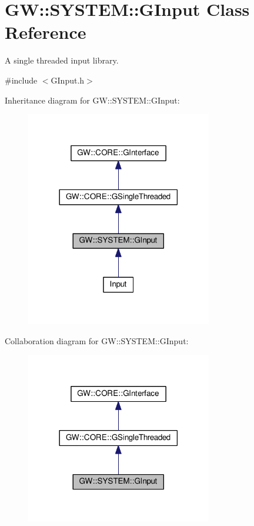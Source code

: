 \hypertarget{classGW_1_1SYSTEM_1_1GInput}{}\section{GW\+:\+:S\+Y\+S\+T\+EM\+:\+:G\+Input Class Reference}
\label{classGW_1_1SYSTEM_1_1GInput}


A single threaded input library.  




{\ttfamily \#include $<$G\+Input.\+h$>$}



Inheritance diagram for GW\+:\+:S\+Y\+S\+T\+EM\+:\+:G\+Input\+:
\nopagebreak
\begin{figure}[H]
\begin{center}
\leavevmode
\includegraphics[width=230pt]{classGW_1_1SYSTEM_1_1GInput__inherit__graph}
\end{center}
\end{figure}


Collaboration diagram for GW\+:\+:S\+Y\+S\+T\+EM\+:\+:G\+Input\+:
\nopagebreak
\begin{figure}[H]
\begin{center}
\leavevmode
\includegraphics[width=230pt]{classGW_1_1SYSTEM_1_1GInput__coll__graph}
\end{center}
\end{figure}
